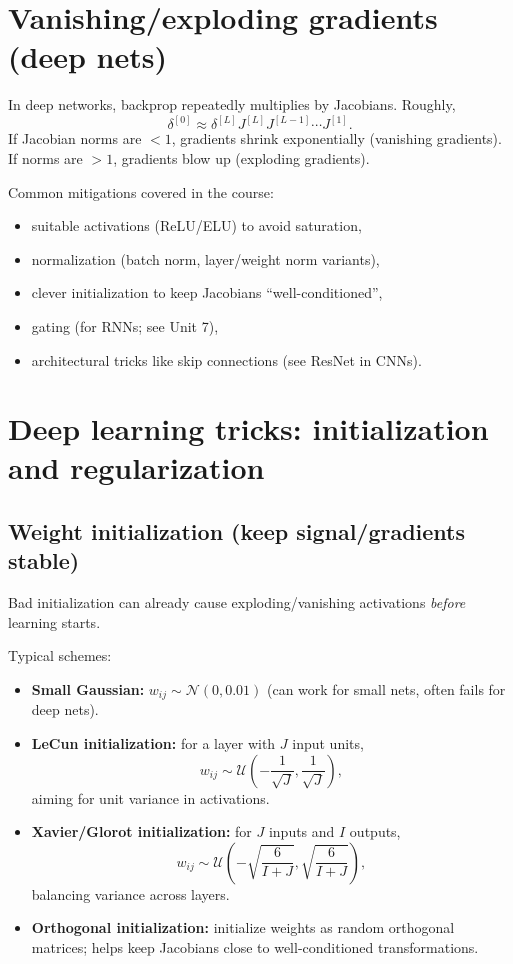 \documentclass[11pt, oneside]{book}
\newcommand{\1}{\ind}                       %
\begin{document}
\section{Vanishing/exploding gradients (deep nets)}
In deep networks, backprop repeatedly multiplies by Jacobians. Roughly,
\[
\delta^{[0]} \approx \delta^{[L]} J^{[L]}J^{[L-1]}\cdots J^{[1]}.
\]
If Jacobian norms are $<1$, gradients shrink exponentially (vanishing gradients). If norms are $>1$, gradients blow up (exploding gradients).

Common mitigations covered in the course:
\begin{itemize}
  \item suitable activations (ReLU/ELU) to avoid saturation,
  \item normalization (batch norm, layer/weight norm variants),
  \item clever initialization to keep Jacobians ``well-conditioned'',
  \item gating (for RNNs; see Unit 7),
  \item architectural tricks like skip connections (see ResNet in CNNs).
\end{itemize}

\section{Deep learning tricks: initialization and regularization}
\subsection{Weight initialization (keep signal/gradients stable)}
Bad initialization can already cause exploding/vanishing activations \emph{before} learning starts.

Typical schemes:
\begin{itemize}
  \item \textbf{Small Gaussian:} $w_{ij}\sim\mathcal{N}(0,0.01)$ (can work for small nets, often fails for deep nets).
  \item \textbf{LeCun initialization:} for a layer with $J$ input units,
  \[
    w_{ij}\sim \mathcal{U}\!\left(-\frac{1}{\sqrt{J}},\frac{1}{\sqrt{J}}\right),
  \]
  aiming for unit variance in activations.
  \item \textbf{Xavier/Glorot initialization:} for $J$ inputs and $I$ outputs,
  \[
    w_{ij}\sim \mathcal{U}\!\left(-\sqrt{\frac{6}{I+J}},\sqrt{\frac{6}{I+J}}\right),
  \]
  balancing variance across layers.
  \item \textbf{Orthogonal initialization:} initialize weights as random orthogonal matrices; helps keep Jacobians close to well-conditioned transformations.
\end{itemize}
\end{document}
